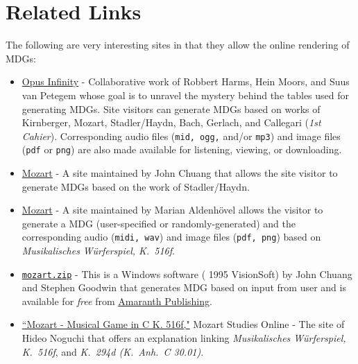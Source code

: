 \documentclass[a4paper,x11names,svgnames,10pt]{article}
\begin{document}
{%
\section{Related Links}
The following are very interesting sites in that they allow the online rendering of MDGs:
\begin{itemize}
	\item \href{https://opus-infinity.org}{Opus Infinity} - Collaborative work of Robbert Harms, Hein Moors, and Suus van Petegem whose goal is to unravel the mystery behind the tables used for generating MDGs.  Site visitors can generate MDGs based on works of Kirnberger, Mozart, Stadler/Haydn, Bach, Gerlach, and Callegari ({\it 1st Cahier}).  Corresponding audio files ({\tt mid, ogg,} and/or {\tt mp3}) and image files ({\tt pdf} or {\tt png}) are also made available for listening, viewing, or downloading.
	
	\item  \href{http://sunsite.univie.ac.at/Mozart/dice/}{Mozart} - A site maintained by John Chuang that allows the site visitor to generate MDGs based on the work of Stadler/Haydn.
	
	\item  \href{https://marian-aldenhoevel.de/mozart/}{Mozart} - A site maintained by Marian Aldenh\"{o}vel allows the visitor to generate a MDG (user-specified or randomly-generated) and the corresponding audio ({\tt midi, wav}) and image files ({\tt pdf, png}) based on {\em Musikalisches W\"{u}rferspiel, K.\ 516f}.
	
	\item \href{https://www.amaranthpublishing.com/mozart.zip}{\tt mozart.zip} -  This is a Windows software ({\small\textcopyright} 1995 VisionSoft) by John Chuang and Stephen Goodwin that generates MDG based on input from user and is available for {\it free} from  \href{http://www.amaranthpublishing.com/MozartDiceGame.htm}{Amaranth Publishing}.  
	
	\item \href{(http://www.asahi-net.or.jp/\~rb5h-ngc/e/k516f.htm}{``Mozart - Musical Game in C K. 516f,"}	Mozart Studies Online - The site of Hideo Noguchi that offers an explanation linking {\em Musikalisches W\"{u}rferspiel, K.\ 516f}, and  {\em K.\ 294d (K.\ Anh.\ C 30.01)}. 
\end{itemize}

\newpage
}
\end{document}
